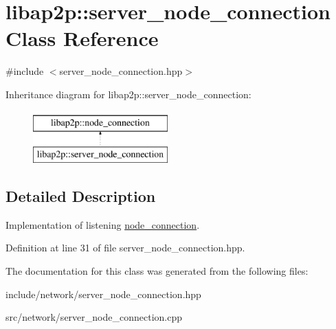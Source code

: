 \hypertarget{classlibap2p_1_1server__node__connection}{\section{libap2p\-:\-:server\-\_\-node\-\_\-connection Class Reference}
\label{classlibap2p_1_1server__node__connection}
}


{\ttfamily \#include $<$server\-\_\-node\-\_\-connection.\-hpp$>$}

Inheritance diagram for libap2p\-:\-:server\-\_\-node\-\_\-connection\-:\begin{figure}[H]
\begin{center}
\leavevmode
\includegraphics[height=2.000000cm]{classlibap2p_1_1server__node__connection}
\end{center}
\end{figure}


\subsection{Detailed Description}
Implementation of listening \hyperlink{classlibap2p_1_1node__connection}{node\-\_\-connection}. 

Definition at line 31 of file server\-\_\-node\-\_\-connection.\-hpp.



The documentation for this class was generated from the following files\-:\begin{DoxyCompactItemize}
\item 
include/network/server\-\_\-node\-\_\-connection.\-hpp\item 
src/network/server\-\_\-node\-\_\-connection.\-cpp\end{DoxyCompactItemize}
